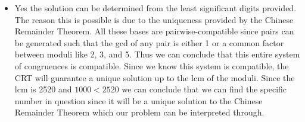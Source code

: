 \documentclass[]{report}
\begin{document}
\begin{itemize}
	\item Yes the solution can be determined from the least significant digits provided.  The reason this is possible is due to the uniqueness provided by the Chinese Remainder Theorem.   All these bases are pairwise-compatible  since pairs can be generated such that the gcd of any pair is either 1 or a common factor between moduli like 2, 3, and 5.  Thus we can conclude that this entire system of congruences is compatible. Since we know this system is compatible, the CRT will guarantee a unique solution up to the lcm of the moduli.  Since the lcm is 2520 and $1000 < 2520$ we can conclude that we can find the specific number in question since it will be a unique solution to the Chinese Remainder Theorem which our problem can be interpreted through. 
\end{itemize}
\end{document}
